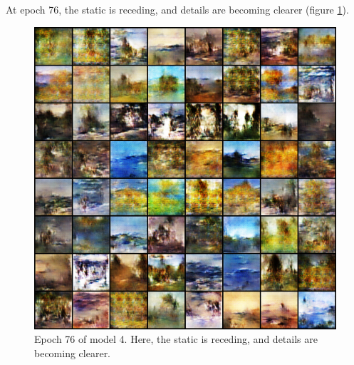 \documentclass[11pt,letterpaper]{article}
\begin{document}
				At epoch 76, the static is receding, and details are becoming clearer (figure \ref{fig:wa64:epoch076generator}).
				\begin{figure}
					\centering
					\includegraphics[width=1.0\linewidth]{results/model4/epoch076_generator}
					\caption{Epoch 76 of model 4. Here, the static is receding, and details are becoming clearer.}
					\label{fig:wa64:epoch076generator}
				\end{figure}
\end{document}
